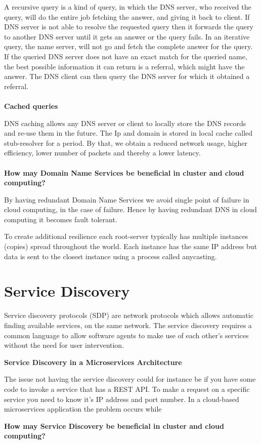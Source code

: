 A recursive query is a kind of query, in which the DNS server, who received the query, will do the entire job fetching the answer, and giving it back to client. If DNS server is not able to resolve the requested query then it forwards the query to another DNS server until it gets an answer or the query fails.
In an iterative query, the name server, will not go and fetch the complete answer for the query. If the queried DNS server does not have an exact match for the queried name, the best possible information it can return is a referral, which might have the answer. The DNS client can then query the DNS server for which it obtained a referral.
\\\\
\textbf{Cached queries}

DNS caching allows any DNS server or client to locally store the DNS records and re-use them in the future. The Ip and domain is stored in local cache called stub-resolver for a period. By that, we obtain a reduced network usage, higher efficiency, lower number of packets and thereby a lower latency. 
\\\\
\textbf{How may Domain Name Services be beneficial in cluster and cloud computing?}

By having redundant Domain Name Services we avoid single point of failure in cloud computing, in the case of failure. Hence by having redundant DNS in cloud computing it becomes fault tolerant.  
   

To create additional resilience each root-server typically has multiple instances (copies) spread throughout the world. Each instance has the same IP address but data is sent to the closest instance using a process called anycasting.

\section{Service Discovery}
Service discovery protocols (SDP) are network protocols which allows automatic finding available services, on the same network. The service discovery requires a common language to allow software agents to make use of each other's services without the need for user intervention.


\textbf{Service Discovery in a Microservices Architecture}

The issue not having the service discovery could for instance be if you have some code to invoke a service that has a REST API. To make a request on a specific service you need to know it's IP address and port number. In a cloud-based microservices application the problem occurs while      



\textbf{How may Service Discovery be beneficial in cluster and cloud computing?}  
